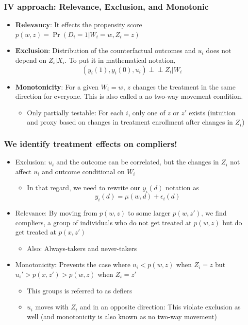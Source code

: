 \documentclass[aspectratio=169]{beamer}
\begin{document}
\begin{frame}
\frametitle{IV approach: Relevance, Exclusion, and Monotonic}
\begin{itemize}
\item \textbf{Relevancy}: It effects the propensity score $p(w,z)=\Pr(D_i=1|W_i=w, Z_i=z)$
\item \textbf{Exclusion}: Distribution of the counterfactual outcomes and $u_i$ does not depend on $Z_i|X_i$. To put it in mathematical notation, 
\[
(y_i(1), y_i(0), u_i) \perp \!\!\!\perp Z_i|W_i
\]
\item \textbf{Monotonicity}: For a given $W_i=w$, $z$ changes the treatment in the same direction for everyone. This is also called a no two-way movement condition.
\begin{itemize}
\item Only partially testable: For each $i$, only one of $z$ or $z'$ exists (intuition and proxy based on changes in treatment enrollment after changes in $Z_i$)
\end{itemize}
\end{itemize}
\end{frame}

\begin{frame}
\frametitle{We identify treatment effects on compliers!}
\begin{itemize}
\item Exclusion: $u_i$ and the outcome can be correlated, but the changes in $Z_i$ not affect $u_i$ and outcome conditional on $W_i$
\begin{itemize}
\item In that regard, we need to rewrite our $y_i(d)$ notation as 
\[
y_i(d)=\mu(w,d)+\epsilon_i(d)
\]
\end{itemize}
\item Relevance: By moving from $p(w,z)$ to some larger $p(w,z')$, we find compliers, a group of individuals who do not get treated at $p(w,z)$ but do get treated at $p(x,z')$
\begin{itemize}
\item Also: Always-takers and never-takers
\end{itemize}
\item Monotonicity: Prevents the case where $u_i<p(w,z)$ when $Z_i=z$ but $u_i'>p(x,z')>p(w,z)$ when $Z_i=z'$
\begin{itemize}
\item This groups is referred to as defiers
\item $u_i$ moves with $Z_i$ and in an opposite direction: This violate exclusion as well (and monotonicity is also known as no two-way movement)
\end{itemize}
\end{itemize}
\end{frame}
\end{document}
